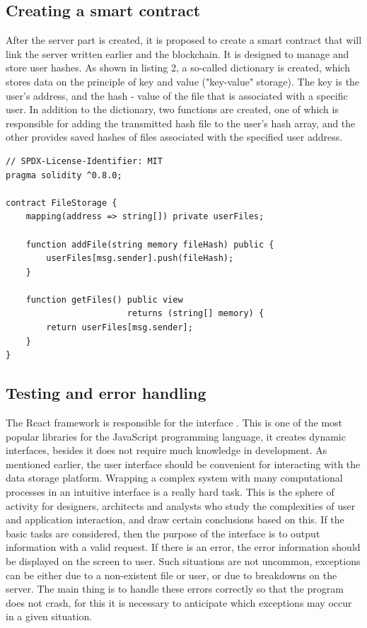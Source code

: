 \documentclass[10pt,conference,a4paper]{IEEEtran_EDM}
\begin{document}
\subsection{Creating a smart contract}
After the server part is created, it is proposed to create a smart contract that will link the server written earlier and the blockchain.
It is designed to manage and store user hashes.
As shown in listing 2, a so-called dictionary is created, which stores data on the principle of key and value ("key-value" storage).
The key is the user's address, and the hash - value of the file that is associated with a specific user.
In addition to the dictionary, two functions are created, one of which is responsible for adding the transmitted hash file to the user's hash array, and the other provides saved hashes of files associated with the specified user address.


\begin{lstlisting}[caption=Solidity code for a smart contract]
// SPDX-License-Identifier: MIT
pragma solidity ^0.8.0;

contract FileStorage {
    mapping(address => string[]) private userFiles;

    function addFile(string memory fileHash) public {
        userFiles[msg.sender].push(fileHash);
    }

    function getFiles() public view
                        returns (string[] memory) {
        return userFiles[msg.sender];
    }
}
\end{lstlisting}

\subsection{Testing and error handling}

The React framework is responsible for the interface \cite{Greg Lim}.
This is one of the most popular libraries for the JavaScript programming language, it creates dynamic interfaces, besides it does not require much knowledge in development.
As mentioned earlier, the user interface should be convenient for interacting with the data storage platform.
Wrapping a complex system with many computational processes in an intuitive interface is a really hard task.
This is the sphere of activity for designers, architects and analysts who study the complexities of user and application interaction, and draw certain conclusions based on this.
If the basic tasks are considered, then the purpose of the interface is to output information with a valid request.
If there is an error, the error information should be displayed on the screen to user.
Such situations are not uncommon, exceptions can be either due to a non-existent file or user, or due to breakdowns on the server.
The main thing is to handle these errors correctly so that the program does not crash, for this it is necessary to anticipate which exceptions may occur in a given situation.
\end{document}
